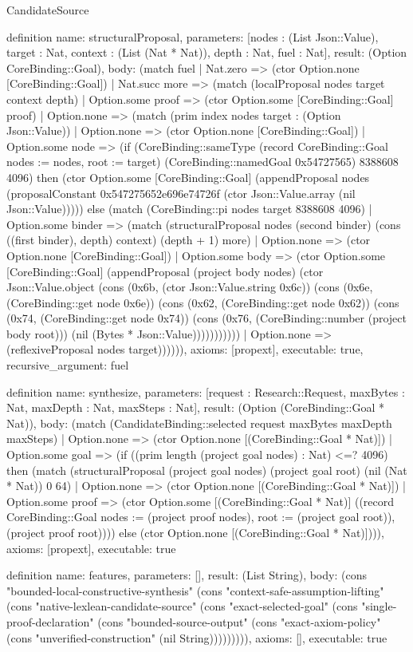 \begin{lexlean}{CandidateSource}
\begin{semanticmodule}
definition{
 name: structuralProposal,
 parameters: [nodes : (List Json::Value), target : Nat, context : (List (Nat * Nat)), depth : Nat, fuel : Nat],
 result: (Option CoreBinding::Goal),
 body: (match fuel | Nat.zero => (ctor Option.none [CoreBinding::Goal]) | Nat.succ more => (match (localProposal nodes target context depth) | Option.some proof => (ctor Option.some [CoreBinding::Goal] proof) | Option.none => (match (prim index nodes target : (Option Json::Value)) | Option.none => (ctor Option.none [CoreBinding::Goal]) | Option.some node => (if (CoreBinding::sameType (record CoreBinding::Goal {nodes := nodes, root := target}) (CoreBinding::namedGoal 0x54727565) 8388608 4096) then (ctor Option.some [CoreBinding::Goal] (appendProposal nodes (proposalConstant 0x547275652e696e74726f (ctor Json::Value.array (nil Json::Value))))) else (match (CoreBinding::pi nodes target 8388608 4096) | Option.some binder => (match (structuralProposal nodes (second binder) (cons ((first binder), depth) context) (depth + 1) more) | Option.none => (ctor Option.none [CoreBinding::Goal]) | Option.some body => (ctor Option.some [CoreBinding::Goal] (appendProposal (project body nodes) (ctor Json::Value.object (cons (0x6b, (ctor Json::Value.string 0x6c)) (cons (0x6e, (CoreBinding::get node 0x6e)) (cons (0x62, (CoreBinding::get node 0x62)) (cons (0x74, (CoreBinding::get node 0x74)) (cons (0x76, (CoreBinding::number (project body root))) (nil (Bytes * Json::Value))))))))))) | Option.none => (reflexiveProposal nodes target)))))),
 axioms: [propext],
 executable: true,
 recursive_argument: fuel
}

definition{
 name: synthesize,
 parameters: [request : Research::Request, maxBytes : Nat, maxDepth : Nat, maxSteps : Nat],
 result: (Option (CoreBinding::Goal * Nat)),
 body: (match (CandidateBinding::selected request maxBytes maxDepth maxSteps) | Option.none => (ctor Option.none [(CoreBinding::Goal * Nat)]) | Option.some goal => (if ((prim length (project goal nodes) : Nat) <=? 4096) then (match (structuralProposal (project goal nodes) (project goal root) (nil (Nat * Nat)) 0 64) | Option.none => (ctor Option.none [(CoreBinding::Goal * Nat)]) | Option.some proof => (ctor Option.some [(CoreBinding::Goal * Nat)] ((record CoreBinding::Goal {nodes := (project proof nodes), root := (project goal root)}), (project proof root)))) else (ctor Option.none [(CoreBinding::Goal * Nat)]))),
 axioms: [propext],
 executable: true
}

definition{
 name: features,
 parameters: [],
 result: (List String),
 body: (cons "bounded-local-constructive-synthesis" (cons "context-safe-assumption-lifting" (cons "native-lexlean-candidate-source" (cons "exact-selected-goal" (cons "single-proof-declaration" (cons "bounded-source-output" (cons "exact-axiom-policy" (cons "unverified-construction" (nil String))))))))),
 axioms: [],
 executable: true
}

\end{semanticmodule}
\end{lexlean}
